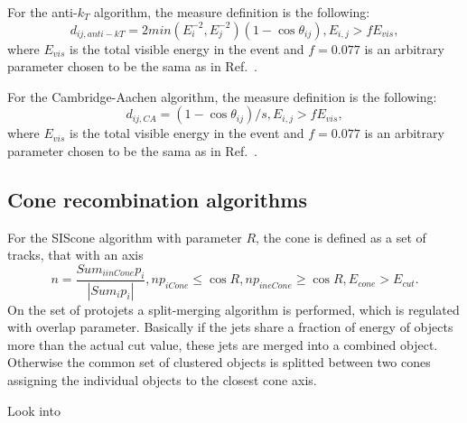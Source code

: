 For the anti-$k_{T}$ algorithm, the measure definition is the following:
$$
d_{ij,anti-kT}=2min(E_i^{-2},E_j^{-2})(1-\cos{\theta_{ij}}), E_{i,j}>fE_{vis},
$$
where $E_{vis}$ is the total visible energy in the event
and $f=0.077$ is an arbitrary parameter chosen to be the sama as in Ref.~\cite{Catani:1991hj}.


For the Cambridge-Aachen algorithm, the measure definition is the following:
$$
d_{ij,CA}=(1-\cos{\theta_{ij}})/s, E_{i,j}>fE_{vis},
$$
where $E_{vis}$ is the total visible energy in the event
and $f=0.077$ is an arbitrary parameter chosen to be the sama as in Ref.~\cite{Catani:1991hj}.
\subsection{Cone recombination algorithms}
\label{sec:algorithmscone}

For the SIScone algorithm with parameter $R$, the cone is defined as a set of tracks, that
with an axis 
$$
n=\frac{Sum_{i in Cone}p_i}{|Sum_{i}p_i|}, np_{i Cone} \le \cos{R}, np_{i ne Cone}\ge \cos{R}, E_{cone}>E_{cut}.
$$
On the set of protojets a split-merging algorithm is performed, which is regulated with
overlap parameter. Basically if the jets share a fraction of energy of objects more than the actual cut value,
these jets are merged into a combined object. Otherwise the common set of clustered objects is splitted between
two cones assigning the individual objects to the closest cone axis.


Look into ~\cite{Weinzierl:2010cw}

